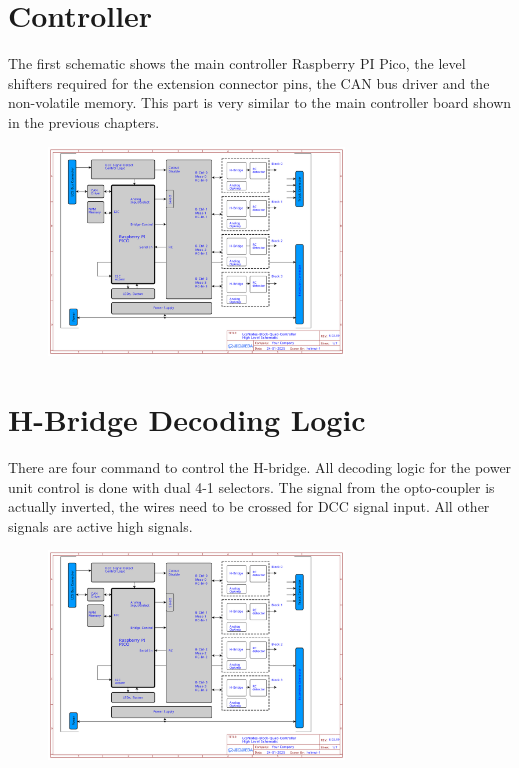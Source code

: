 \section{Controller}

The first schematic shows the main controller Raspberry PI Pico, the level shifters required for the extension connector pins, the CAN bus driver and the non-volatile memory. This part is very similar to the main controller board shown in the previous chapters.

\begin{figure}[htbp]
    \centering
    \includegraphics[page=2, width=0.7\textwidth]{./Schematics/Schematic_LcsNodes-Block-Quad-Controller.pdf}
\end{figure}
\FloatBarrier

\section{H-Bridge Decoding Logic}

There are four command to control the H-bridge. All decoding logic for the power unit control is done with dual 4-1 selectors. The signal from the opto-coupler is actually inverted, the wires need to be crossed for DCC signal input. All other signals are active high signals. 

\begin{figure}[htbp]
    \centering
    \includegraphics[page=3, width=0.7\textwidth]{./Schematics/Schematic_LcsNodes-Block-Quad-Controller.pdf}
\end{figure}
\FloatBarrier

